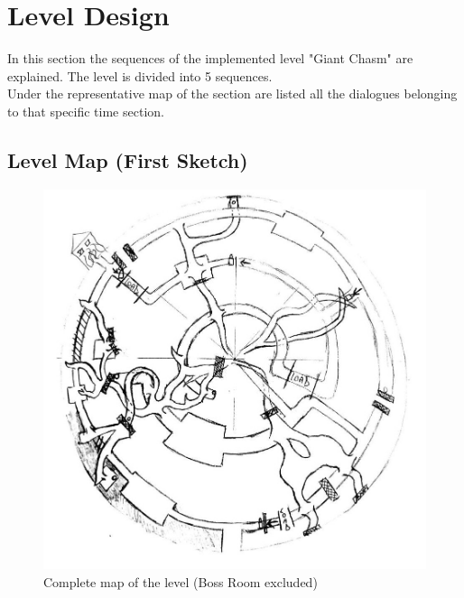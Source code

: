 \section{Level Design}
In this section the sequences of the implemented level "Giant Chasm" are explained. The level is divided into 5 sequences.\\
Under the representative map of the section are listed all the dialogues belonging to that specific time section.

\subsection{Level Map (First Sketch)}

\begin{figure}[H]
	\centering
	\includegraphics[width=0.8\linewidth]{images/visual_ref/15_giant_chasm/chasm_map.jpg}
	\caption*{Complete map of the level (Boss Room excluded)}
\end{figure}

